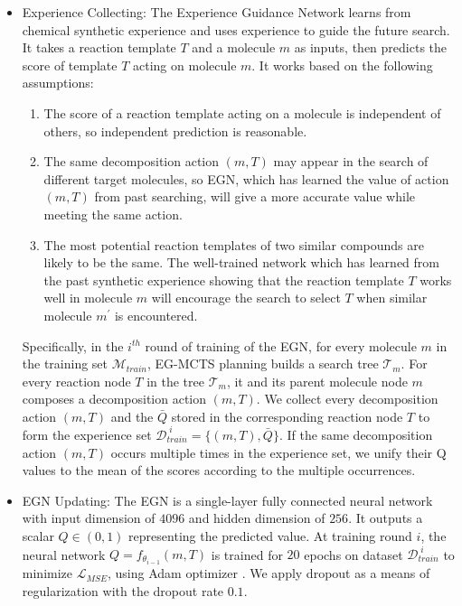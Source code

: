 \documentclass[sn-mathphys,Numbered]{sn-jnl}
\begin{document}
\begin{itemize}
    \item Experience Collecting: The Experience Guidance Network learns from chemical synthetic experience and uses experience to guide the future search. It takes a reaction template $T$ and a molecule $m$ as inputs, then predicts the score of template $T$ acting on molecule $m$. It works based on the following assumptions:
    \begin{enumerate}
        \item The score of a reaction template acting on a molecule is independent of others, so independent prediction is reasonable.
        \item The same decomposition action $(m, T)$ may appear in the search of different target molecules, so EGN, which has learned the value of action $(m, T)$ from past searching, will give a more accurate value while meeting the same action.
        \item The most potential reaction templates of two similar compounds are likely to be the same. The well-trained network which has learned from the past synthetic experience showing that the reaction template $T$ works well in molecule $m$ will encourage the search to select $T$ when similar molecule $m^{\prime}$ is encountered.
    \end{enumerate}
    Specifically, in the $i^{th}$ round of training of the EGN, for every molecule $m$ in the training set $\mathcal{M}_{train}$, EG-MCTS planning builds a search tree $\mathcal{T}_{m}$. For every reaction node $T$ in the tree $\mathcal{T}_{m}$, it and its parent molecule node $m$ composes a decomposition action $(m,T)$. We collect every decomposition action $(m,T)$ and the $\bar{Q}$ stored in the corresponding  reaction node $T$ to form the experience set $\mathcal{D}_{train}^{\;i } = \{(m,T),\bar{Q}\}$. If the same decomposition action $(m,T)$ occurs multiple times in the experience set, we unify their Q values to the mean of the scores according to the multiple occurrences.
    \item EGN Updating: The EGN is a single-layer fully connected neural network with input dimension of $4096$ and hidden dimension of $256$. It outputs a scalar $Q \in (0,1)$ representing the predicted value. 
    At training round $i$, the neural network $Q=f_{\theta_{i-1}}(m,T)$ is trained for $20$ epochs on dataset $\mathcal{D}_{train}^{\;i }$ to minimize $\mathcal{L}_{MSE}$, using Adam optimizer \citep{Adam}.
    We apply dropout \citep{dropout} as a means of regularization with the dropout rate $0.1$.

\end{itemize}
\end{document}
